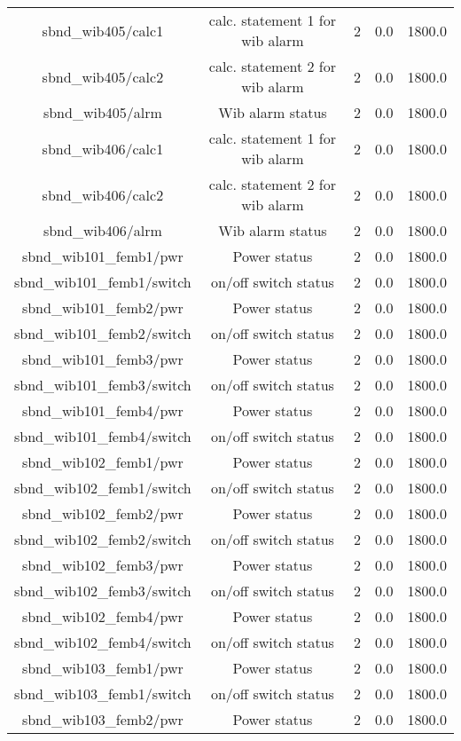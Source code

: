 \begin{table}[ptb]
\begin{tabular}{c | c c c c}
sbnd_wib405/calc1 & calc. statement 1 for wib alarm & 2 & 0.0 & 1800.0\\ 
sbnd_wib405/calc2 & calc. statement 2 for wib alarm & 2 & 0.0 & 1800.0\\ 
sbnd_wib405/alrm & Wib alarm status & 2 & 0.0 & 1800.0\\ 
sbnd_wib406/calc1 & calc. statement 1 for wib alarm & 2 & 0.0 & 1800.0\\ 
sbnd_wib406/calc2 & calc. statement 2 for wib alarm & 2 & 0.0 & 1800.0\\ 
sbnd_wib406/alrm & Wib alarm status & 2 & 0.0 & 1800.0\\ 
sbnd_wib101_femb1/pwr & Power status & 2 & 0.0 & 1800.0\\ 
sbnd_wib101_femb1/switch & on/off switch status & 2 & 0.0 & 1800.0\\ 
sbnd_wib101_femb2/pwr & Power status & 2 & 0.0 & 1800.0\\ 
sbnd_wib101_femb2/switch & on/off switch status & 2 & 0.0 & 1800.0\\ 
sbnd_wib101_femb3/pwr & Power status & 2 & 0.0 & 1800.0\\ 
sbnd_wib101_femb3/switch & on/off switch status & 2 & 0.0 & 1800.0\\ 
sbnd_wib101_femb4/pwr & Power status & 2 & 0.0 & 1800.0\\ 
sbnd_wib101_femb4/switch & on/off switch status & 2 & 0.0 & 1800.0\\ 
sbnd_wib102_femb1/pwr & Power status & 2 & 0.0 & 1800.0\\ 
sbnd_wib102_femb1/switch & on/off switch status & 2 & 0.0 & 1800.0\\ 
sbnd_wib102_femb2/pwr & Power status & 2 & 0.0 & 1800.0\\ 
sbnd_wib102_femb2/switch & on/off switch status & 2 & 0.0 & 1800.0\\ 
sbnd_wib102_femb3/pwr & Power status & 2 & 0.0 & 1800.0\\ 
sbnd_wib102_femb3/switch & on/off switch status & 2 & 0.0 & 1800.0\\ 
sbnd_wib102_femb4/pwr & Power status & 2 & 0.0 & 1800.0\\ 
sbnd_wib102_femb4/switch & on/off switch status & 2 & 0.0 & 1800.0\\ 
sbnd_wib103_femb1/pwr & Power status & 2 & 0.0 & 1800.0\\ 
sbnd_wib103_femb1/switch & on/off switch status & 2 & 0.0 & 1800.0\\ 
sbnd_wib103_femb2/pwr & Power status & 2 & 0.0 & 1800.0\\ 

\end{tabular}
\end{table}
